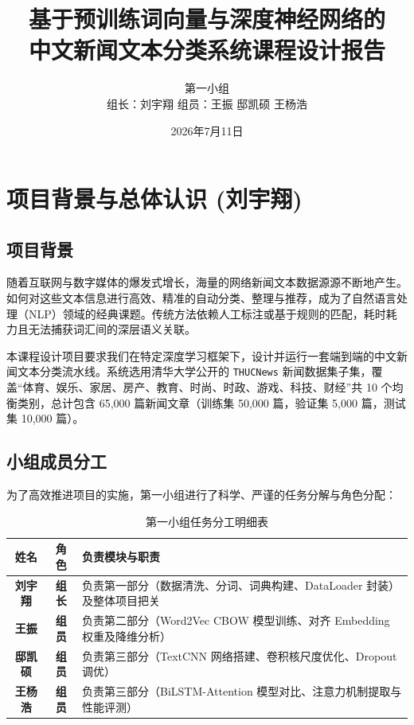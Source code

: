 \documentclass[UTF8,a4paper,11pt]{ctexart}
\title{\heiti\Huge 基于预训练词向量与深度神经网络的\\中文新闻文本分类系统课程设计报告}
\author{\large 第一小组\\
\vspace{0.4cm}
组长：刘宇翔 \quad 组员：王振 \quad 邸凯硕 \quad 王杨浩}
\date{2026年7月11日}
\begin{document}
\maketitle
\thispagestyle{empty}
\newpage

\thispagestyle{empty}
\tableofcontents
\newpage

\section{项目背景与总体认识 (刘宇翔)}

\subsection{项目背景}
随着互联网与数字媒体的爆发式增长，海量的网络新闻文本数据源源不断地产生。如何对这些文本信息进行高效、精准的自动分类、整理与推荐，成为了自然语言处理（NLP）领域的经典课题。传统方法依赖人工标注或基于规则的匹配，耗时耗力且无法捕获词汇间的深层语义关联。

本课程设计项目要求我们在特定深度学习框架下，设计并运行一套端到端的中文新闻文本分类流水线。系统选用清华大学公开的 \texttt{THUCNews} 新闻数据集子集，覆盖“体育、娱乐、家居、房产、教育、时尚、时政、游戏、科技、财经”共 10 个均衡类别，总计包含 65,000 篇新闻文章（训练集 50,000 篇，验证集 5,000 篇，测试集 10,000 篇）。

\subsection{小组成员分工}
为了高效推进项目的实施，第一小组进行了科学、严谨的任务分解与角色分配：
\begin{table}[htbp]
\centering
\caption{第一小组任务分工明细表}
\label{tab:division}
\begin{tabular}{ccl}
\toprule
姓名 & 角色 & 负责模块与职责 \\
\midrule
\textbf{刘宇翔} & \textbf{组长} & 负责第一部分（数据清洗、分词、词典构建、DataLoader 封装）及整体项目把关 \\
\textbf{王振}   & \textbf{组员} & 负责第二部分（Word2Vec CBOW 模型训练、对齐 Embedding 权重及降维分析） \\
\textbf{邸凯硕} & \textbf{组员} & 负责第三部分（TextCNN 网络搭建、卷积核尺度优化、Dropout 调优） \\
\textbf{王杨浩} & \textbf{组员} & 负责第三部分（BiLSTM-Attention 模型对比、注意力机制提取与性能评测） \\
\bottomrule
\end{tabular}
\end{table}
\end{document}
